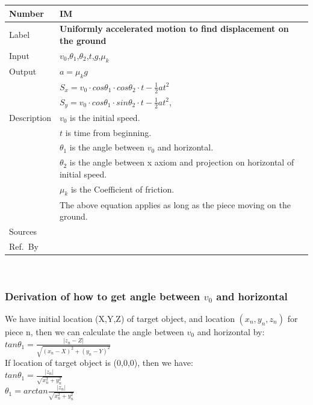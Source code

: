 \documentclass[12pt]{article}
\newcommand{\colAwidth}{0.13\textwidth}
\newcommand{\colBwidth}{0.82\textwidth}
\newcounter{instnum} %
\begin{document}
	\noindent
	\begin{minipage}{\textwidth}
		\renewcommand*{\arraystretch}{1.5}
		\begin{tabular}{| p{\colAwidth} | p{\colBwidth}|}
			\hline
			\rowcolor[gray]{0.9}
			Number& IM{instnum}\theinstnum \label{IM_DOG}\\
			\hline
			Label& \bf Uniformly accelerated motion to find displacement on the ground\\
			\hline
			Input&$v_{0}$,$\theta_{1}$,$\theta_{2}$,$t$,$g$,$\mu_{k}$\\
			\hline
			Output&$a=\mu_{k}g$\\
			&$S_{x}=v_{0}\cdot cos\theta _{1}\cdot cos\theta _{2}\cdot t-\frac{1}{2}at^{2}$\\
			&$S_{y}=v_{0}\cdot cos\theta _{1}\cdot sin\theta _{2}\cdot t-\frac{1}{2}at^{2}$,\\
			\hline
			Description&$v_{0}$ is the initial speed.\\
			&$t$ is time from beginning.\\
			&$\theta _{1}$ is the angle between $v_{0}$ and horizontal.\\
			&$\theta _{2}$ is the angle between x axiom and projection on horizontal of initial speed.\\
			&$\mu_{k}$ is the Coefficient of friction.\\
			& The above equation applies as long as the piece moving on the ground.
			\\
			\hline
			Sources&~\ \ \\
			\hline
			Ref.\ By & \\
			\hline
		\end{tabular}
	\end{minipage}\\
	
	
	\subsubsection*{Derivation of how to get angle between $v_{0}$ and horizontal}
	
	We have initial location (X,Y,Z) of target object, and location $(x_{n},y_{n},z_{n})$ for piece n, then we can calculate the angle between $v_{0}$ and horizontal by:
	~\newline
	\\
	$tan\theta_{1}=\frac{|z_{n}-Z|}{\sqrt{(x_{n}-X)^{2}+(y_{n}-Y)^{2}}}$
	~\newline
	\\
	If location of target object is (0,0,0), then we have:
	~\newline
	\\
	$tan\theta_{1}=\frac{|z_{n}|}{\sqrt{x_{n}^{2}+y_{n}^{2}}}$
	~\newline
	\\
	$\theta_{1}=arctan \frac{|z_{n}|}{\sqrt{x_{n}^2+y_{n}^2}}$
	~\newline
	\\
	
\end{document}
